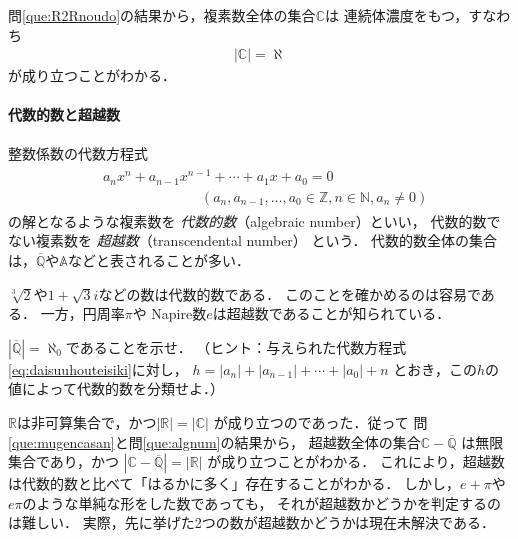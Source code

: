    問\ref{que:R2Rnoudo}の結果から，複素数全体の集合$\mathbb{C}$は
   連続体濃度をもつ，すなわち
   \begin{align}
     \lvert \mathbb{C} \rvert = \aleph
     \label{eq:Cnoudo}
   \end{align}
   が成り立つことがわかる．

  \paragraph{代数的数と超越数}
   整数係数の代数方程式
   \begin{align}
     \begin{aligned}
       & a_n x^n + a_{n-1} x^ {n-1} + \cdots + a_1 x + a_0 =0 \\
       & \qquad \qquad \qquad \quad ( a_n , a_{n-1} , \ldots , a_0 \in \mathbb{Z} , 
       n \in \mathbb{N} , a_n \neq 0)
     \end{aligned}
     \label{eq:daisuuhouteisiki}
   \end{align}
   の解となるような複素数を
   \emph{代数的数}（algebraic number）といい，
   代数的数でない複素数を
   \emph{超越数}（transcendental number）
   という．
   代数的数全体の集合は，$\overline{\mathbb{Q}}$や$\mathbb{A}$などと表されることが多い．
   \begin{ex} \label{ex:algenum}
     $\sqrt[3]{2}$や$1 + \sqrt{3} i$などの数は代数的数である．
     このことを確かめるのは容易である．
     一方，円周率$\pi$や
     Napire数$e$は超越数であることが知られている．
   \end{ex}

   \begin{que} \label{que:algnum}
     $\left \lvert \overline{\mathbb{Q}}\right \rvert = \aleph _0$であることを示せ．
     （ヒント：与えられた代数方程式\eqref{eq:daisuuhouteisiki}に対し，
     $h= \lvert a_n \rvert + \lvert a_{n-1} \rvert + \cdots + \lvert a_0 \rvert + n$
     とおき，この$h$の値によって代数的数を分類せよ．）
   \end{que}

   $\mathbb{R}$は非可算集合で，かつ$\lvert \mathbb{R} \rvert = \lvert \mathbb{C} \rvert$
   が成り立つのであった．従って
   問\ref{que:mugencasan}と問\ref{que:algnum}の結果から，
   超越数全体の集合$\mathbb{C}- \overline{\mathbb{Q}}$
   は無限集合であり，かつ
     $\left \lvert \mathbb{C} - \overline{\mathbb{Q}} \right \rvert 
     = \lvert \mathbb{R} \lvert$
   が成り立つことがわかる．
   これにより，超越数は代数的数と比べて「はるかに多く」存在することがわかる．
   しかし，$e + \pi$や$e \pi$のような単純な形をした数であっても，
   それが超越数かどうかを判定するのは難しい．
   実際，先に挙げた2つの数が超越数かどうかは現在未解決である．


